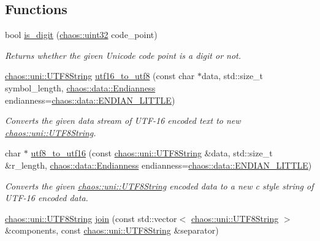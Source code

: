 \subsection*{Functions}
\begin{DoxyCompactItemize}
\item 
bool \hyperlink{namespacechaos_1_1uni_a25a7549a0378aeac227c881220c23640}{is\-\_\-digit} (\hyperlink{namespacechaos_a8641b3ae4551f0b35570d4f9f4ec22d9}{chaos\-::uint32} code\-\_\-point)
\begin{DoxyCompactList}\small\item\em Returns whether the given Unicode code point is a digit or not. \end{DoxyCompactList}\item 
\hyperlink{classchaos_1_1uni_1_1_u_t_f8_string}{chaos\-::uni\-::\-U\-T\-F8\-String} \hyperlink{namespacechaos_1_1uni_abde7063d11cab650cbe316f20b94c4e9}{utf16\-\_\-to\-\_\-utf8} (const char $\ast$data, std\-::size\-\_\-t symbol\-\_\-length, \hyperlink{namespacechaos_1_1data_adb2657d50c0b84cdc1153001031bbf3f}{chaos\-::data\-::\-Endianness} endianness=\hyperlink{namespacechaos_1_1data_adb2657d50c0b84cdc1153001031bbf3fa7fc5455bb6147c278dfa4a84e255c66d}{chaos\-::data\-::\-E\-N\-D\-I\-A\-N\-\_\-\-L\-I\-T\-T\-L\-E})
\begin{DoxyCompactList}\small\item\em Converts the given data stream of U\-T\-F-\/16 encoded text to new \hyperlink{classchaos_1_1uni_1_1_u_t_f8_string}{chaos\-::uni\-::\-U\-T\-F8\-String}. \end{DoxyCompactList}\item 
char $\ast$ \hyperlink{namespacechaos_1_1uni_a3ec4746c1c3433619edfd24c8b0b8b9d}{utf8\-\_\-to\-\_\-utf16} (const \hyperlink{classchaos_1_1uni_1_1_u_t_f8_string}{chaos\-::uni\-::\-U\-T\-F8\-String} \&data, std\-::size\-\_\-t \&r\-\_\-length, \hyperlink{namespacechaos_1_1data_adb2657d50c0b84cdc1153001031bbf3f}{chaos\-::data\-::\-Endianness} endianness=\hyperlink{namespacechaos_1_1data_adb2657d50c0b84cdc1153001031bbf3fa7fc5455bb6147c278dfa4a84e255c66d}{chaos\-::data\-::\-E\-N\-D\-I\-A\-N\-\_\-\-L\-I\-T\-T\-L\-E})
\begin{DoxyCompactList}\small\item\em Converts the given \hyperlink{classchaos_1_1uni_1_1_u_t_f8_string}{chaos\-::uni\-::\-U\-T\-F8\-String} encoded data to a new c style string of U\-T\-F-\/16 encoded data. \end{DoxyCompactList}\item 
\hyperlink{classchaos_1_1uni_1_1_u_t_f8_string}{chaos\-::uni\-::\-U\-T\-F8\-String} \hyperlink{namespacechaos_1_1uni_ad2a77983423c8b10e2b18cae6f35d329}{join} (const std\-::vector$<$ \hyperlink{classchaos_1_1uni_1_1_u_t_f8_string}{chaos\-::uni\-::\-U\-T\-F8\-String} $>$ \&components, const \hyperlink{classchaos_1_1uni_1_1_u_t_f8_string}{chaos\-::uni\-::\-U\-T\-F8\-String} \&separator)

\end{DoxyCompactItemize}
